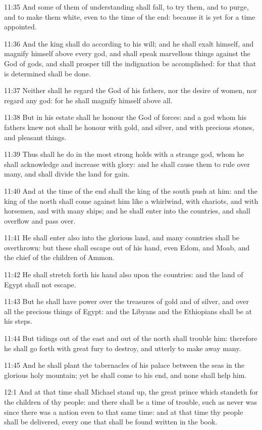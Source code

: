 11:35 And some of them of understanding shall fall, to try them, and
to purge, and to make them white, even to the time of the end: because
it is yet for a time appointed.

11:36 And the king shall do according to his will; and he shall exalt
himself, and magnify himself above every god, and shall speak
marvellous things against the God of gods, and shall prosper till the
indignation be accomplished: for that that is determined shall be
done.

11:37 Neither shall he regard the God of his fathers, nor the desire
of women, nor regard any god: for he shall magnify himself above all.

11:38 But in his estate shall he honour the God of forces: and a god
whom his fathers knew not shall he honour with gold, and silver, and
with precious stones, and pleasant things.

11:39 Thus shall he do in the most strong holds with a strange god,
whom he shall acknowledge and increase with glory: and he shall cause
them to rule over many, and shall divide the land for gain.

11:40 And at the time of the end shall the king of the south push at
him: and the king of the north shall come against him like a
whirlwind, with chariots, and with horsemen, and with many ships; and
he shall enter into the countries, and shall overflow and pass over.

11:41 He shall enter also into the glorious land, and many countries
shall be overthrown: but these shall escape out of his hand, even
Edom, and Moab, and the chief of the children of Ammon.

11:42 He shall stretch forth his hand also upon the countries: and the
land of Egypt shall not escape.

11:43 But he shall have power over the treasures of gold and of
silver, and over all the precious things of Egypt: and the Libyans and
the Ethiopians shall be at his steps.

11:44 But tidings out of the east and out of the north shall trouble
him: therefore he shall go forth with great fury to destroy, and
utterly to make away many.

11:45 And he shall plant the tabernacles of his palace between the
seas in the glorious holy mountain; yet he shall come to his end, and
none shall help him.

12:1 And at that time shall Michael stand up, the great prince which
standeth for the children of thy people: and there shall be a time of
trouble, such as never was since there was a nation even to that same
time: and at that time thy people shall be delivered, every one that
shall be found written in the book.

